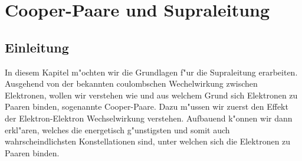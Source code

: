 \chapter{Cooper-Paare und Supraleitung\label{chapter:supraleitung}}
\begin{refsection}




\newpage
\section{Einleitung}
In diesem Kapitel m"ochten wir die Grundlagen f"ur die Supraleitung erarbeiten. Ausgehend von der bekannten coulombschen Wechelwirkung zwischen Elektronen, wollen wir verstehen wie und aus welchem Grund sich Elektronen zu Paaren binden, sogenannte Cooper-Paare. Dazu m"ussen wir zuerst den Effekt der Elektron-Elektron Wechselwirkung verstehen. Aufbauend k"onnen wir dann erkl"aren, welches die energetisch g"unstigsten und somit auch wahrscheindlichsten Konstellationen sind, unter welchen sich die Elektronen zu Paaren binden.


\end{refsection}
